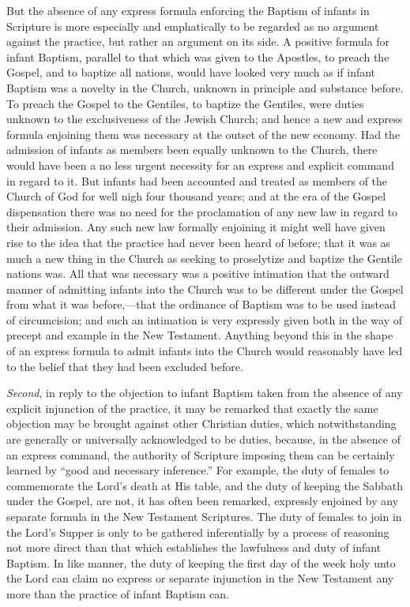 \documentclass[english,]{book}
\begin{document}
But the absence of any express formula enforcing the Baptism of infants in Scripture is more especially and emphatically to be regarded as no argument against the practice, but rather an argument on its side. A positive formula for infant Baptism, parallel to that which was given to the Apostles, to preach the Gospel, and to baptize all nations, would have looked very much as if infant Baptism was a novelty in the Church, unknown in principle and substance before. To preach the Gospel to the Gentiles, to baptize the Gentiles, were duties unknown to the exclusiveness of the Jewish Church; and hence a new and express formula enjoining them was necessary at the outset of the new economy. Had the admission of infants as members been equally unknown to the Church, there would have been a no less urgent necessity for an express and explicit command in regard to it. But infants had been accounted and treated as members of the Church of God for well nigh four thousand years; and at the era of the Gospel dispensation there was no need for the proclamation of any new law in regard to their admission. Any such new law formally enjoining it might well have given rise to the idea that the practice had never been heard of before; that it was as much a new thing in the Church as seeking to proselytize and baptize the Gentile nations was. All that was necessary was a positive intimation that the outward manner of admitting infants into the Church was to be different under the Gospel from what it was before,---that the ordinance of Baptism was to be used instead of circumcision; and such an intimation is very expressly given both in the way of precept and example in the New Testament. Anything beyond this in the shape of an express formula to admit infants into the Church would reasonably have led to the belief that they had been excluded before.

\emph{Second}, in reply to the objection to infant Baptism taken from the absence of any explicit injunction of the practice, it may be remarked that exactly the same objection may be brought against other Christian duties, which notwithstanding are generally or universally acknowledged to be duties, because, in the absence of an express command, the authority of Scripture imposing them can be certainly learned by ``good and necessary inference.'' For example, the duty of females to commemorate the Lord's death at His table, and the duty of keeping the Sabbath under the Gospel, are not, it has often been remarked, expressly enjoined by any separate formula in the New Testament Scriptures. The duty of females to join in the Lord's Supper is only to be gathered inferentially by a process of reasoning not more direct than that which establishes the lawfulness and duty of infant Baptism. In like manner, the duty of keeping the first day of the week holy unto the Lord can claim no express or separate injunction in the New Testament any more than the practice of infant Baptism can.
\end{document}
